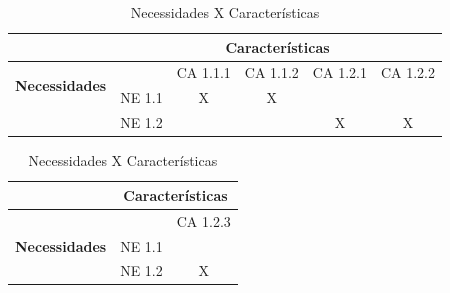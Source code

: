 
\begin{table}[!h]
\centering
\caption{Necessidades X Características}
\label{Necessidades_X_Caracteristicas_1}
\begin{tabular}{|c|c|c|c|c|c|}
\hline
  & \multicolumn{5}{c|}{\textbf{Características}}      \\ \hline
    \multirow{2}{*}{\textbf{Necessidades}} &        & CA 1.1.1 & CA 1.1.2 & CA 1.2.1 & CA 1.2.2 \\ \cline{2-6}
                                                    & NE 1.1 & X        & X        &          &          \\ \cline{2-6}
                                                    & NE 1.2 &          &          & X        & X        \\ \hline
\end{tabular}
\end{table}


\begin{table}[!h]
\centering
\caption{Necessidades X Características}
\label{Necessidades_X_Caracteristicas_2}
\begin{tabular}{|c|c|c|}
\hline
  & \multicolumn{2}{c|}{\textbf{Características}} \\ \hline
    \multirow{3}{*}{\textbf{Necessidades}} &  & CA 1.2.3               \\ \cline{2-3}
                                              & NE 1.1               &                        \\ \cline{2-3}
                                              & NE 1.2               & X                      \\ \hline
\end{tabular}
\end{table}



